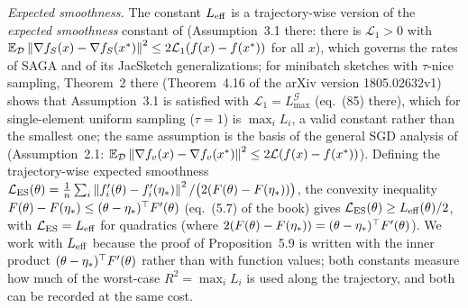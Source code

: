 \emph{Expected smoothness.} The constant $L_{\mathrm{eff}}$ is a trajectory-wise version of the \emph{expected
smoothness} constant of \cite{gower2021stochastic} (Assumption~3.1 there: there is $\mathcal L_1>0$ with
$\mathbb{E}_{\mathcal D}\left\|\nabla f_S(x)-\nabla f_S(x^\ast)\right\|^2\le2\mathcal L_1(f(x)-f(x^\ast))$ for all $x$), which
governs the rates of SAGA and of its JacSketch generalizations; for minibatch sketches with $\tau$-nice sampling,
Theorem~2 there (Theorem~4.16 of the arXiv version 1805.02632v1) shows that Assumption~3.1 is satisfied with
$\mathcal L_1=L^{\mathcal G}_{\max}$ (eq.~(85) there), which for single-element uniform sampling ($\tau=1$) is $\max_iL_i$,
a valid constant rather than the smallest one; the same assumption is the basis of the general SGD analysis of
\cite{gower2019sgd} (Assumption~2.1: $\mathbb{E}_{\mathcal D}\left\|\nabla f_v(x)-\nabla f_v(x^\ast)\right\|^2\le2\mathcal L(f(x)-f(x^\ast))$).
Defining the trajectory-wise expected smoothness
$\mathcal L_{\mathrm{ES}}(\theta)=\frac1n\sum_i\left\|f'_i(\theta)-f'_i(\eta_\ast)\right\|^2/\big(2(F(\theta)-F(\eta_\ast))\big)$,
the convexity inequality $F(\theta)-F(\eta_\ast)\le(\theta-\eta_\ast)^\top F'(\theta)$ (eq.~(5.7) of the book) gives
$\mathcal L_{\mathrm{ES}}(\theta)\ge L_{\mathrm{eff}}(\theta)/2$, with $\mathcal L_{\mathrm{ES}}=L_{\mathrm{eff}}$ for quadratics (where
$2(F(\theta)-F(\eta_\ast))=(\theta-\eta_\ast)^\top F'(\theta)$). We work with $L_{\mathrm{eff}}$ because the proof of
Proposition~5.9 is written with the inner product $(\theta-\eta_\ast)^\top F'(\theta)$ rather than with function values;
both constants measure how much of the worst-case $R^2=\max_iL_i$ is used along the trajectory, and both can
be recorded at the same cost.
